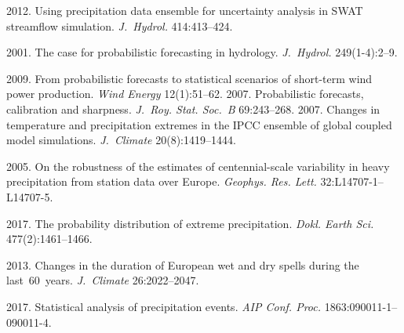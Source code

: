   \begin{multicols}{2}

\renewcommand{\bibname}{\protect\rmfamily References}

{\small\frenchspacing
 {%
 \begin{thebibliography}{99}


 2012.
Using precipitation data ensemble for uncertainty analysis in SWAT streamflow
simulation. \textit{J.~Hydrol.} 414:413--424.

 2001. The case for probabilistic forecasting in hydrology. 
\textit{J.~Hydrol.} 249(1-4):2--9.

 2009.
From probabilistic forecasts to statistical scenarios of short-term wind power
production. \textit{Wind Energy} 12(1):51--62.
 2007. Probabilistic forecasts,
calibration and sharpness.
\textit{J.~Roy. Stat. Soc.~B} 69:243--268.
 2007. Changes in
temperature and precipitation extremes in the IPCC ensemble of global coupled model
simulations. \textit{J.~Climate} 20(8):1419--1444.

2005. On the robustness of the
estimates of centennial-scale variability in heavy precipitation from station data over
Europe. \textit{Geophys. Res. Lett.} 32:L14707-1--L14707-5.

 2017. The probability distribution of extreme precipitation. 
\textit{Dokl. Earth Sci.} 477(2):1461--1466.

 2013.
Changes in the duration of European wet and dry spells during the last~60~years. 
\textit{J.~Climate} 26:2022--2047.



2017. Statistical analysis of precipitation events. 
\textit{AIP Conf. Proc.} 1863:090011-1--090011-4.


\end{thebibliography}}}
\end{multicols}
